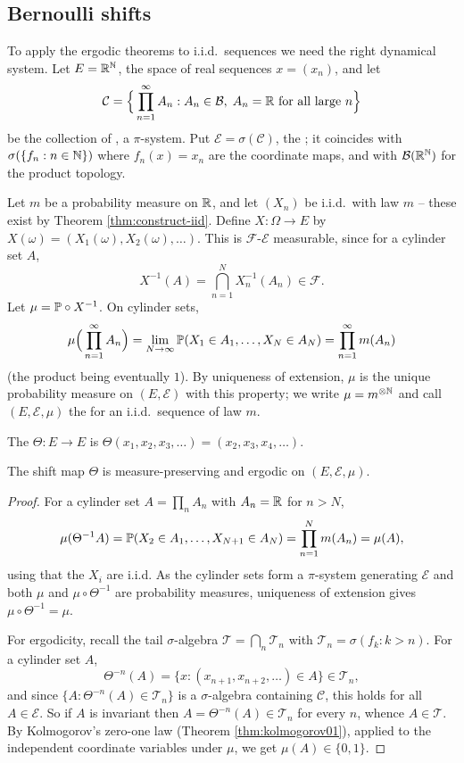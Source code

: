 \documentclass[a4paper]{scrartcl}
\newcommand{\cB}{\mathcal{B}}
\newcommand{\cC}{\mathcal{C}}
\newcommand{\cE}{\mathcal{E}}
\newcommand{\cF}{\mathcal{F}}
\newcommand{\cT}{\mathcal{T}}
\begin{document}
\subsection{Bernoulli shifts}

To apply the ergodic theorems to i.i.d.\ sequences we need the right dynamical system. Let $E = \mathbb{R}^{\mathbb{N}}$, the space of real sequences $x = (x_n)$, and let
$$
\cC = \Big\{ \prod_{n=1}^\infty A_n : A_n \in \cB, \; A_n = \R \text{ for all large } n \Big\}
$$
be the collection of , a $\pi$-system. Put $\cE = \sigma(\cC)$, the ; it coincides with $\sigma(\{f_n : n \in \mathbb{N}\})$ where $f_n(x)=x_n$ are the coordinate maps, and with $\cB(\R^\N)$ for the product topology.

Let $m$ be a probability measure on $\mathbb{R}$, and let $(X_n)$ be i.i.d.\ with law $m$ -- these exist by Theorem \ref{thm:construct-iid}. Define $X : \Omega \to E$ by $X(\omega)=(X_1(\omega),X_2(\omega),\dots)$. This is $\cF$-$\cE$ measurable, since for a cylinder set $A$,
$$
X^{-1}(A) = \bigcap_{n=1}^N X_n^{-1}(A_n) \in \cF.
$$
Let $\mu = \mathbb{P}\circ X^{-1}$. On cylinder sets,
$$
\mu\Big(\prod_{n=1}^\infty A_n\Big) = \lim_{N\to\infty}\mathbb{P}(X_1 \in A_1,\dots,X_N \in A_N) = \prod_{n=1}^\infty m(A_n)
$$
(the product being eventually $1$). By uniqueness of extension, $\mu$ is the unique probability measure on $(E,\cE)$ with this property; we write $\mu = m^{\otimes\mathbb{N}}$ and call $(E,\cE,\mu)$ the  for an i.i.d.\ sequence of law $m$.

\begin{definition}
	The  $\Theta : E \to E$ is $\Theta(x_1,x_2,x_3,\dots)=(x_2,x_3,x_4,\dots)$.
\end{definition}

\begin{theorem}\label{thm:shift-ergodic}
	The shift map $\Theta$ is measure-preserving and ergodic on $(E,\cE,\mu)$.
\end{theorem}
\begin{proof}
	For a cylinder set $A = \prod_n A_n$ with $A_n = \mathbb{R}$ for $n>N$,
	$$
	\mu(\Theta^{-1}A)=\mathbb{P}(X_2\in A_1,\dots,X_{N+1}\in A_N)=\prod_{n=1}^N m(A_n)=\mu(A),
	$$
	using that the $X_i$ are i.i.d. As the cylinder sets form a $\pi$-system generating $\cE$ and both $\mu$ and $\mu\circ\Theta^{-1}$ are probability measures, uniqueness of extension gives $\mu\circ\Theta^{-1}=\mu$.

	For ergodicity, recall the tail $\sigma$-algebra $\cT = \bigcap_n \cT_n$ with $\cT_n = \sigma(f_k : k>n)$. For a cylinder set $A$,
	$$
	\Theta^{-n}(A) = \{x : (x_{n+1},x_{n+2},\dots)\in A\} \in \cT_n,
	$$
	and since $\{A : \Theta^{-n}(A)\in\cT_n\}$ is a $\sigma$-algebra containing $\cC$, this holds for all $A \in \cE$. So if $A$ is invariant then $A = \Theta^{-n}(A)\in\cT_n$ for every $n$, whence $A \in \cT$. By Kolmogorov's zero-one law (Theorem \ref{thm:kolmogorov01}), applied to the independent coordinate variables under $\mu$, we get $\mu(A)\in\{0,1\}$.
\end{proof}
\end{document}
